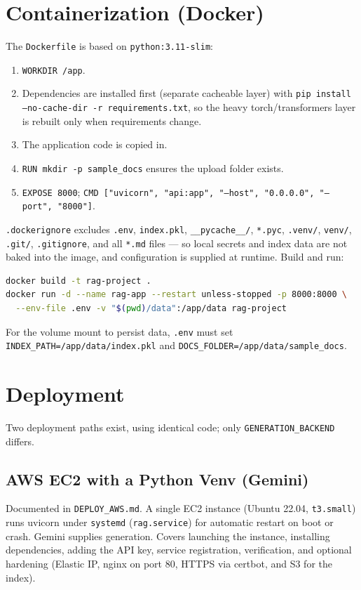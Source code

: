 \documentclass[11pt,a4paper]{article}
\newcommand{\code}[1]{\texttt{#1}}
\begin{document}
\section{Containerization (Docker)}
The \code{Dockerfile} is based on \code{python:3.11-slim}:
\begin{enumerate}
  \item \code{WORKDIR /app}.
  \item Dependencies are installed first (separate cacheable layer) with
        \code{pip install --no-cache-dir -r requirements.txt}, so the heavy
        torch/transformers layer is rebuilt only when requirements change.
  \item The application code is copied in.
  \item \code{RUN mkdir -p sample\_docs} ensures the upload folder exists.
  \item \code{EXPOSE 8000}; \code{CMD ["uvicorn", "api:app", "--host",
        "0.0.0.0", "--port", "8000"]}.
\end{enumerate}
\code{.dockerignore} excludes \code{.env}, \code{index.pkl},
\code{__pycache__/}, \code{*.pyc}, \code{.venv/}, \code{venv/}, \code{.git/},
\code{.gitignore}, and all \code{*.md} files --- so local secrets and index
data are not baked into the image, and configuration is supplied at runtime.
Build and run:
\begin{lstlisting}[language=bash, style=bashstyle]
docker build -t rag-project .
docker run -d --name rag-app --restart unless-stopped -p 8000:8000 \
  --env-file .env -v "$(pwd)/data":/app/data rag-project
\end{lstlisting}
For the volume mount to persist data, \code{.env} must set
\code{INDEX\_PATH=/app/data/index.pkl} and
\code{DOCS\_FOLDER=/app/data/sample\_docs}.

\section{Deployment}
Two deployment paths exist, using identical code; only
\code{GENERATION\_BACKEND} differs.

\subsection{AWS EC2 with a Python Venv (Gemini)}
Documented in \code{DEPLOY\_AWS.md}. A single EC2 instance (Ubuntu 22.04,
\texttt{t3.small}) runs uvicorn under \texttt{systemd} (\code{rag.service})
for automatic restart on boot or crash. Gemini supplies generation. Covers
launching the instance, installing dependencies, adding the API key, service
registration, verification, and optional hardening (Elastic IP, nginx on port
80, HTTPS via certbot, and S3 for the index).
\end{document}
